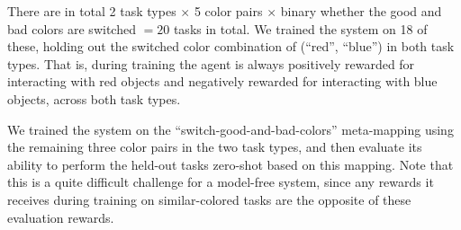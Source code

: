 There are in total 2 task types \(\times\) 5 color pairs \(\times\) binary whether the good and bad colors are switched \(= 20\) tasks in total. We trained the system on 18 of these, holding out the switched color combination of (``red'', ``blue'') in both task types. That is, during training the agent is always positively rewarded for interacting with red objects and negatively rewarded for interacting with blue objects, across both task types.\par
We trained the system on the ``switch-good-and-bad-colors'' meta-mapping using the remaining three color pairs in the two task types, and then evaluate its ability to perform the held-out tasks zero-shot based on this mapping. Note that this is a quite difficult challenge for a model-free system, since any rewards it receives during training on similar-colored tasks are the opposite of these evaluation rewards.\par

